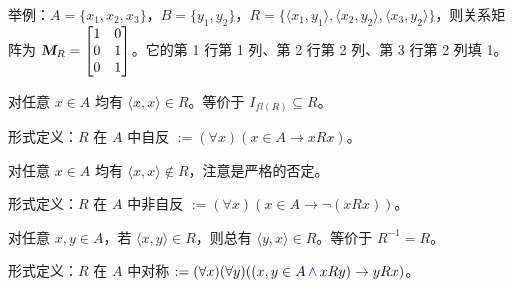 \documentclass[UTF8]{ctexart}
\newcommand\Concept[1]{\colorbox{cyan!10!white}{\textcolor{cyan!40!black}{#1}}}
\newcommand\Notes[1]{\textcolor{yellow!50!black}{\small #1}}
\newcommand\Example[1]{\textcolor{cyan!70!black}{\small #1}}
\newcommand\relation[2]{\langle #1,#2 \rangle}
\newcommand\pos[1]{\marginpar{\footnotesize\ttfamily\textcolor{yellow!50!black}{\hfill #1}}}
\newcommand\h{\text{\textcolor{blue}{\,$\wedge$\,}}} %
\newcommand\f{\neg} %
\newcommand\defines{:=}
\begin{document}
\begin{description}[parsep=0pt]
    \Example{举例：$A=\{x_1,x_2,x_3\}$，$B=\{y_1,y_2\}$，$R=\{\relation{x_1}{y_1},\relation{x_2}{y_2},\relation{x_3}{y_2}\}$，则关系矩阵为 $\text{\slshape\bfseries M}_R = \begin{bmatrix}
      1 & 0 \\
      0 & 1 \\
      0 & 1 \\
    \end{bmatrix}$。它的第 1 行第 1 列、第 2 行第 2 列、第 3 行第 2 列填 1。}
\item[\Concept{自反性}] 对任意 $x\in A$ 均有 $\relation{x}{x}\in R$。等价于 $I_{fl(R)}\subseteq R$。\pos{4.4 节}

    \Notes{形式定义：$R$ 在 $A$ 中自反 $\defines (\forall x)(x\in A\to xRx)$。}

\item[\Concept{非自反性}] 对任意 $x\in A$ 均有 $\relation{x}{x}\notin R$，注意是严格的否定。

    \Notes{形式定义：$R$ 在 $A$ 中非自反 $\defines (\forall x)(x\in A\to \f(xRx))$。}
\item[\Concept{对称性}] 对任意 $x,y\in A$，若 $\relation{x}{y}\in R$，则总有 $\relation{y}{x}\in R$。等价于 $R^{-1}=R$。

    \Notes{形式定义：$R$ 在 $A$ 中对称 $\defines (\forall x)(\forall y)((x,y\in A \h xRy )\to yRx)$。}
\end{description}
\end{document}

